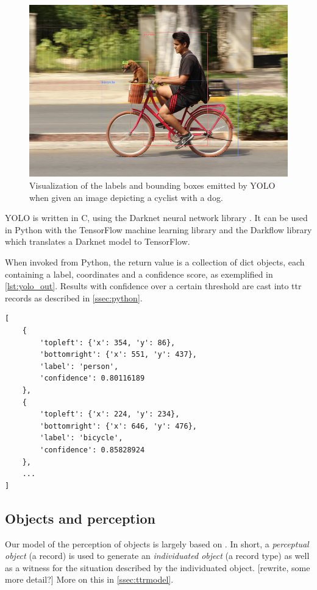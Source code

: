 \begin{figure}[h]
\label{fig:dogbike_annotated}
\includegraphics[width=\textwidth]{dogbike_annotated}
\centering
\caption{Visualization of the labels and bounding boxes emitted by YOLO when given an image depicting a cyclist with a dog.}
\end{figure}

YOLO is written in C, using the Darknet neural network library \citep{darknet13}.
It can be used in Python with the TensorFlow machine learning library and the Darkflow library which translates a Darknet model to TensorFlow.

When invoked from Python, the return value is a collection of dict objects, each containing a label, coordinates and a confidence score, as exemplified in \autoref{lst:yolo_out}.
Results with confidence over a certain threshold are cast into \gls{ttr} records as described in \autoref{ssec:python}.

\begin{lstlisting}[label=lst:yolo_out, caption=Example output of YOLO invocation]
[
	{
		'topleft': {'x': 354, 'y': 86},
		'bottomright': {'x': 551, 'y': 437},
		'label': 'person',
		'confidence': 0.80116189
	},
	{
		'topleft': {'x': 224, 'y': 234},
		'bottomright': {'x': 646, 'y': 476},
		'label': 'bicycle',
		'confidence': 0.85828924
	},
	...
]
\end{lstlisting}



\subsection{Objects and perception}

Our model of the perception of objects is largely based on \cite{lspc}.
In short, a \textit{perceptual object} (a record) is used to generate an \textit{individuated object} (a record type) as well as a witness for the situation described by the individuated object. [rewrite, some more detail?]
More on this in \autoref{ssec:ttrmodel}.


